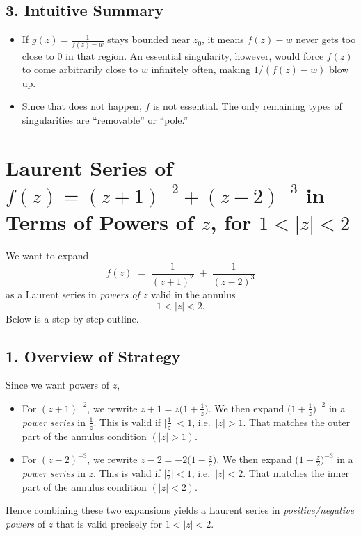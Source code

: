\documentclass[12pt]{article}
\theoremstyle{definition} %
\theoremstyle{plain} %
\begin{document}
\subsection*{3. Intuitive Summary}

\begin{itemize}
\item If $g(z)=\frac{1}{f(z)-w}$ stays bounded near $z_0$, it means $f(z)-w$ never gets too close to $0$ in that region.  An essential singularity, however, would force $f(z)$ to come arbitrarily close to $w$ infinitely often, making $1/(f(z)-w)$ blow up.
\item Since that does not happen, $f$ is not essential.  The only remaining types of singularities are “removable” or “pole.” 
\end{itemize}

\section*{Laurent Series of \(\displaystyle f(z)=(z+1)^{-2} + (z-2)^{-3}\) in Terms of Powers of \(z\), for \(1<|z|<2\)}

We want to expand
\[
f(z) \;=\; \frac{1}{(z+1)^2} \;+\; \frac{1}{(z-2)^3}
\]
as a Laurent series in \emph{powers of \(z\)} valid in the annulus
\[
1 < |z| < 2.
\]
Below is a step‐by‐step outline.

\bigskip

\subsection*{1. Overview of Strategy}

Since we want powers of \(z\),
\begin{itemize}
  \item For \((z+1)^{-2}\), we rewrite \(z+1 = z\bigl(1 + \tfrac{1}{z}\bigr)\).  
    We then expand \(\bigl(1 + \tfrac{1}{z}\bigr)^{-2}\) in a \emph{power series} in \(\tfrac{1}{z}\).  This is valid if \(\bigl|\tfrac{1}{z}\bigr| < 1\), i.e.\ \(|z|>1\).  That matches the outer part of the annulus condition \((|z|>1)\).
  \item For \((z-2)^{-3}\), we rewrite \(z-2 = -2\bigl(1 - \tfrac{z}{2}\bigr)\).  
    We then expand \(\bigl(1 - \tfrac{z}{2}\bigr)^{-3}\) in a \emph{power series} in \(z\).  This is valid if \(\bigl|\tfrac{z}{2}\bigr|<1\), i.e.\ \(|z|<2\).  That matches the inner part of the annulus condition \((|z|<2)\).
\end{itemize}
Hence combining these two expansions yields a Laurent series in \emph{positive/negative powers} of \(z\) that is valid precisely for \(1<|z|<2\).
\end{document}
